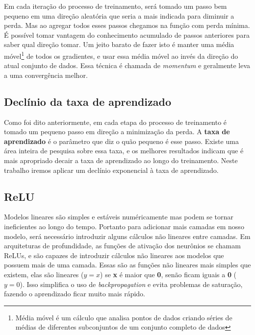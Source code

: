 Em cada iteração do processo de treinamento, será tomado um passo bem
pequeno em uma direção aleatória que seria a mais indicada para
diminuir a perda. Mas ao agregar todos esses passos chegamos na função
com perda mínima. É possível tomar vantagem do conhecimento acumulado
de passos anteriores para saber qual direção tomar. Um jeito barato de
fazer isto é manter uma média móvel\footnote{Média móvel é um cálculo
  que analisa pontos de dados criando séries de médias de diferentes
  subconjuntos de um conjunto completo de dados} de todos os
gradientes, e usar essa média móvel ao invés da direção do atual
conjunto de dados. Essa técnica é chamada de \textit{momentum} e
geralmente leva a uma convergência melhor.

\subsection{Declínio da taxa de aprendizado}

Como foi dito anteriormente, em cada etapa do processo de treinamento
é tomado um pequeno passo em direção a minimização da perda. A {\bf
  taxa de aprendizado} é o parâmetro que diz o quão pequeno é esse
passo. Existe uma área inteira de pesquisa sobre essa taxa, e os
melhores resultados indicam que é mais apropriado decair a taxa de
aprendizado ao longo do treinamento. Neste trabalho iremos aplicar
um declínio exponencial à taxa de aprendizado.\cite{Zeiler}

\subsection{ReLU}

Modelos lineares são simples e estáveis numéricamente mas podem se
tornar ineficientes ao longo do tempo. Portanto para adicionar mais
camadas em nosso modelo, será necessário introduzir alguns cálculos
não lineares entre camadas. Em arquiteturas de profundidade, as
funções de ativação dos neurônios se chamam ReLUs, e são capazes de
introduzir cálculos não lineares aos modelos que possuem mais de uma
camada. Essas são as funções não lineares mais simples que
existem, elas são lineares ($y=x$) se {\bf x} é maior que {\bf 0},
senão ficam iguais a {\bf 0} ($y=0$). Isso simplifica o uso de
\textit{backpropagation} e evita problemas de saturação, fazendo o
aprendizado ficar muito mais rápido.

